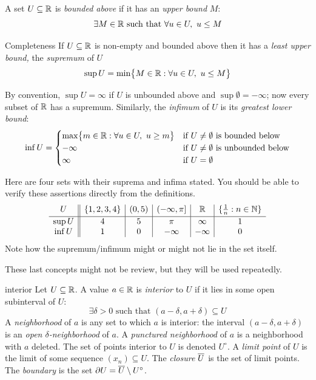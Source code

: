 
A set $U\subseteq\mathbb{R}$ is \emph{bounded above} if it has an \emph{upper bound} $M$:
\[\exists M\in\mathbb{R}\text{ such that }\forall u\in U,\ u\le M\]


\begin{axiom}{Completeness}{}
If $U\subseteq\mathbb{R}$ is non-empty and bounded above then it has a \emph{least upper bound,} the \emph{supremum} of $U$
\[\sup U=\min\bigl\{M\in\R:\forall u\in U,\ u\le M\bigr\}\]
\end{axiom}

By convention, $\sup U=\infty$ if $U$ is unbounded above and $\sup\emptyset=-\infty$; now every subset of $\mathbb{R}$ has a supremum. Similarly, the \emph{infimum} of $U$ is its \emph{greatest lower bound}:
	\[\inf U=\begin{cases}
	\max\bigl\{m\in\mathbb{R}:\forall u\in U,\ u\ge m\bigr\} &\text{if $U\neq\emptyset$ is bounded below}\\
	-\infty&\text{if $U\neq\emptyset$ is unbounded below}\\
	\infty&\text{if $U=\emptyset$}
	\end{cases}\]
	
\begin{examples}{}{}
Here are four sets with their suprema and infima stated. You should be able to verify these assertions directly from the definitions.
\[\begin{array}{c||c|c|c|c|c}
	U&\{1,2,3,4\}&(0,5)&(-\infty,\pi]&\mathbb{R}&\{\frac 1n:n\in\mathbb{N}\}\\[2pt]\hline
	\sup U&4&5&\pi&\infty&1\\
	\inf U&1&0&-\infty&-\infty&0
	\end{array}\]
	Note how the supremum/infimum might or might not lie in the set itself.
\end{examples}



These last concepts might not be review, but they will be used repeatedly.

\begin{defn}{}{interior}
Let $U\subseteq\mathbb{R}$. A value $a\in\mathbb{R}$ is \emph{interior} to $U$ if it lies in some open subinterval of $U$:
\[\exists\delta>0\text{ such that }(a-\delta,a+\delta)\subseteq U\]
A \emph{neighborhood} of $a$ is any set to which $a$ is interior: the interval $(a-\delta,a+\delta)$ is an \emph{open $\delta$-neighborhood} of $a$. A \emph{punctured neighborhood} of $a$ is a neighborhood with $a$ deleted.\smallbreak
The set of points interior to $U$ is denoted $U^\circ$.\smallbreak
A \emph{limit point} of $U$ is the limit of some sequence $(x_n)\subseteq U$. The \emph{closure} $\overline{U}$ is the set of limit points.\smallbreak
The \emph{boundary} is the set $\partial U=\overline{U}\setminus U^\circ$.\medbreak
\end{defn}

